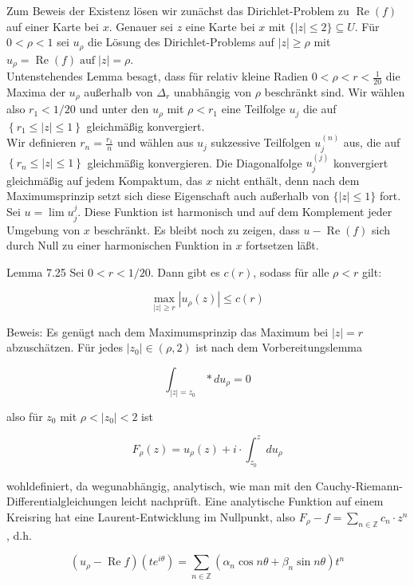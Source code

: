 \documentclass[10pt, letterpaper]{article}
\begin{document}
Zum Beweis der Existenz lösen wir zunächst das Dirichlet-Problem zu $\operatorname{Re}(f)$ auf einer Karte bei $x$. Genauer sei $z$ eine Karte bei $x$ mit $\{|z| \leq 2\} \subseteq U$. Für $0<\rho<1$ sei $u_{\rho}$ die Lösung des Dirichlet-Problems auf $|z| \geqslant \rho$ mit $u_{\rho}=\operatorname{Re}(f) \operatorname{auf}|z|=\rho$.\\
Untenstehendes Lemma besagt, dass für relativ kleine Radien $0<\rho<r<\frac{1}{20}$ die Maxima der $u_{\rho}$ außerhalb von $\Delta_{r}$ unabhängig von $\rho$ beschränkt sind. Wir wählen also $r_{1}<1 / 20$ und unter den $u_{\rho}$ mit $\rho<r_{1}$ eine Teilfolge $u_{j}$ die auf $\left\{r_{1} \leqslant|z| \leqslant 1\right\}$ gleichmäßig konvergiert.\\
Wir definieren $r_{n}=\frac{r_{1}}{n}$ und wählen aus $u_{j}$ sukzessive Teilfolgen $u_{j}^{(n)}$ aus, die auf $\left\{r_{n} \leqslant|z| \leqslant 1\right\}$ gleichmäßig konvergieren. Die Diagonalfolge $u_{j}^{(j)}$ konvergiert gleichmäßig auf jedem Kompaktum, das $x$ nicht enthält, denn nach dem Maximumsprinzip setzt sich diese Eigenschaft auch außerhalb von $\{|z| \leqslant 1\}$ fort. Sei $u=\lim u_{j}^{j}$. Diese Funktion ist harmonisch und auf dem Komplement jeder Umgebung von $x$ beschränkt. Es bleibt noch zu zeigen, dass $u-\operatorname{Re}(f)$ sich durch Null zu einer harmonischen Funktion in $x$ fortsetzen läßt.

Lemma 7.25 Sei $0<r<1 / 20$. Dann gibt es $c(r)$, sodass für alle $\rho<r$ gilt:

$$
\max _{|z| \geqslant r}\left|u_{\rho}(z)\right| \leqslant c(r)
$$

Beweis: Es genügt nach dem Maximumsprinzip das Maximum bei $|z|=r$ abzuschätzen. Für jedes $\left|z_{0}\right| \in(\rho, 2)$ ist nach dem Vorbereitungslemma

$$
\int_{|z|=z_{0}} * d u_{\rho}=0
$$

also für $z_{0}$ mit $\rho<\left|z_{0}\right|<2$ ist

$$
F_{\rho}(z)=u_{\rho}(z)+i \cdot \int_{z_{0}}^{z} d u_{\rho}
$$

wohldefiniert, da wegunabhängig, analytisch, wie man mit den Cauchy-Riemann-Differentialgleichungen leicht nachprüft. Eine analytische Funktion auf einem Kreisring hat eine Laurent-Entwicklung im Nullpunkt, also $F_{\rho}-f=\sum_{n \in \mathbb{Z}} c_{n} \cdot z^{n}$, d.h.

$$
\left(u_{\rho}-\operatorname{Re} f\right)\left(t e^{i \theta}\right)=\sum_{n \in \mathbb{Z}}\left(\alpha_{n} \cos n \theta+\beta_{n} \sin n \theta\right) t^{n}
$$
\end{document}
